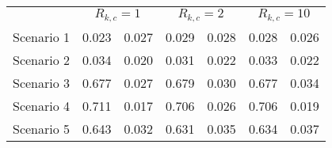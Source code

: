 
\begin{tabular}{rccccc}
\toprule 
&  &  &  \\
Scenario 1 & 0.023 &0.027 &0.029 &0.028 &0.028 &0.026 \\
Scenario 2 & 0.034 &0.020 &0.031 &0.022 &0.033 &0.022 \\
Scenario 3 & 0.677 &0.027 &0.679 &0.030 &0.677 &0.034 \\
Scenario 4 & 0.711 &0.017 &0.706 &0.026 &0.706 &0.019 \\
Scenario 5 & 0.643 &0.032 &0.631 &0.035 &0.634 &0.037 \\
\bottomrule  
\end{tabular}

 

